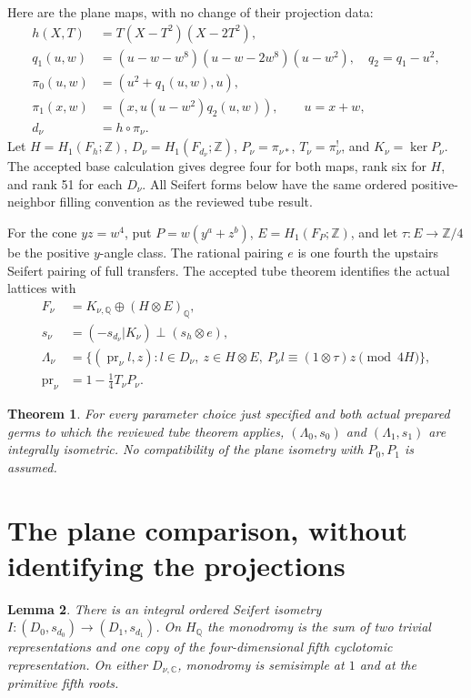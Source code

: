 \documentclass[11pt]{article}
\newtheorem{theorem}{Theorem}
\newtheorem{lemma}[theorem]{Lemma}
\newcommand{\Q}{\mathbb Q}
\newcommand{\Z}{\mathbb Z}
\newcommand{\C}{\mathbb C}
\newcommand{\pr}{\operatorname{pr}}
\begin{document}
Here are the plane maps, with no change of their projection data:
\[
\begin{split}
 h(X,T)&=T(X-T^2)(X-2T^2),\\
 q_1(u,w)&=(u-w-w^8)(u-w-2w^8)(u-w^2),\quad q_2=q_1-u^2,\\
 \pi_0(u,w)&=(u^2+q_1(u,w),u),\\
 \pi_1(x,w)&=(x,u(u-w^2)q_2(u,w)),\qquad u=x+w,\\
 d_\nu&=h\circ\pi_\nu.
\end{split}                                                    \tag{1}
\]
Let \(H=H_1(F_h;\Z)\), \(D_\nu=H_1(F_{d_\nu};\Z)\),
\(P_\nu=\pi_{\nu*}\), \(T_\nu=\pi_\nu^!\), and \(K_\nu=\ker P_\nu\).
The accepted base calculation gives degree four for both maps, rank
six for \(H\), and rank 51 for each \(D_\nu\).
All Seifert forms below have the same ordered positive-neighbor
filling convention as the reviewed tube result.

For the cone \(yz=w^4\), put \(P=w(y^a+z^b)\),
\(E=H_1(F_P;\Z)\), and let \(\tau:E\to\Z/4\) be the positive
\(y\)-angle class. The rational pairing \(e\) is one fourth the
upstairs Seifert pairing of full transfers. The accepted tube theorem
identifies the actual lattices with
\[
\begin{split}
 F_\nu&=K_{\nu,\Q}\oplus(H\otimes E)_\Q,\\
 s_\nu&=(-s_{d_\nu}|K_\nu)\perp(s_h\otimes e),\\
 \Lambda_\nu&=\{(\pr_\nu l,z):l\in D_\nu,\ z\in H\otimes E,\
        P_\nu l\equiv(1\otimes\tau)z\pmod{4H}\},\\
 \pr_\nu&=1-\tfrac14 T_\nu P_\nu. 
\end{split}                                                    \tag{2}
\]

\begin{theorem}\label{thm:result}
For every parameter choice just specified and both actual prepared
germs to which the reviewed tube theorem applies,
\((\Lambda_0,s_0)\) and \((\Lambda_1,s_1)\) are integrally isometric.
No compatibility of the plane isometry with \(P_0,P_1\) is assumed.
\end{theorem}

\section{The plane comparison, without identifying the projections}

\begin{lemma}\label{lem:plane}
There is an integral ordered Seifert isometry
\(I:(D_0,s_{d_0})\to(D_1,s_{d_1})\).
On \(H_\Q\) the monodromy is the sum of two trivial representations
and one copy of the four-dimensional fifth cyclotomic representation.
On either \(D_{\nu,\C}\), monodromy is semisimple at \(1\) and at
the primitive fifth roots.
\end{lemma}
\end{document}
